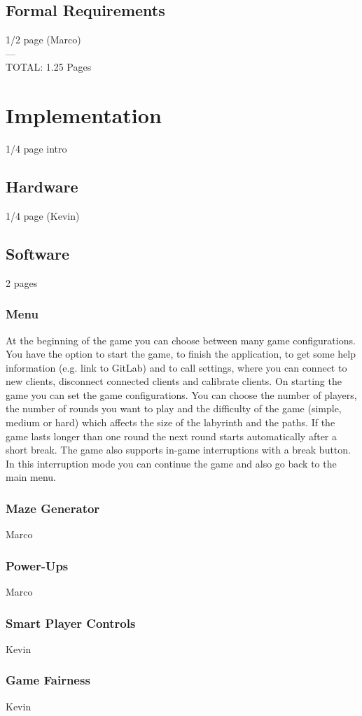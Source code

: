 \documentclass{sigchi}
\begin{document}
\subsection{Formal Requirements}
1/2 page (Marco)\\
---\\
TOTAL: 1.25 Pages

\section{Implementation}
1/4 page intro
\subsection{Hardware}
1/4 page (Kevin)
\subsection{Software}
2 pages
\subsubsection{Menu}
At the beginning of the game you can choose between many game configurations. You have the option to start the game, to finish the application, to get some help information (e.g. link to GitLab) and to call settings, where you can connect to new clients, disconnect connected clients and calibrate clients. On starting the game you can set the game configurations. You can choose the number of players, the number of rounds you want to play and the difficulty of the game (simple, medium or hard) which affects the size of the labyrinth and the paths. If the game lasts longer than one round the next round starts automatically after a short break. The game also supports in-game interruptions with a break button. In this interruption mode you can continue the game and also go back to the main menu.
\subsubsection{Maze Generator} Marco
\subsubsection{Power-Ups} Marco
\subsubsection{Smart Player Controls} Kevin
\subsubsection{Game Fairness} Kevin
\end{document}
